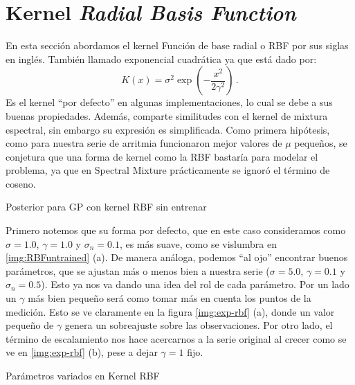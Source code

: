 \documentclass[letterpaper,11pt,oneside]{article}
\theoremstyle{break}
\begin{document}

\section{Kernel \textit{Radial Basis Function}}

En esta sección abordamos el kernel Función de base radial o RBF por sus siglas en inglés. También llamado exponencial cuadrática ya que está dado por:
$$ K(x) = \sigma^2\exp(-\frac{x^2}{2\gamma^2}) \,.$$
Es el kernel ``por defecto'' en algunas implementaciones, lo cual se debe a sus buenas propiedades. Además, comparte similitudes con el kernel de mixtura espectral, sin embargo su expresión es simplificada. Como primera hipótesis, como para nuestra serie de arritmia funcionaron mejor valores de $\mu$ pequeños, se conjetura que una forma de kernel como la RBF bastaría para modelar el problema, ya que en Spectral Mixture prácticamente se ignoró el término de coseno.

\begin{images}[\label{img:RBFuntrained}]{Posterior para GP con kernel RBF sin entrenar}
\end{images}

Primero notemos que su forma por defecto, que en este caso consideramos como $\sigma=1.0$, $\gamma=1.0$ y $\sigma_n=0.1$, es más suave, como se vislumbra en \ref{img:RBFuntrained} (a). De manera análoga, podemos ``al ojo'' encontrar buenos parámetros, que se ajustan más o menos bien a nuestra serie ($\sigma=5.0$, $\gamma=0.1$ y $\sigma_n=0.5$). Esto ya nos va dando una idea del rol de cada parámetro. Por un lado un $\gamma$ más bien pequeño será como tomar más en cuenta los puntos de la medición. Esto se ve claramente en la figura \ref{img:exp-rbf} (a), donde un valor pequeño de $\gamma$ genera un sobreajuste sobre las observaciones. Por otro lado, el término de escalamiento nos hace acercarnos a la serie original al crecer como se ve en \ref{img:exp-rbf} (b), pese a dejar $\gamma=1$ fijo.

\begin{images}[\label{img:exp-rbf}]{Parámetros variados en Kernel RBF}
\end{images}
\end{document}
